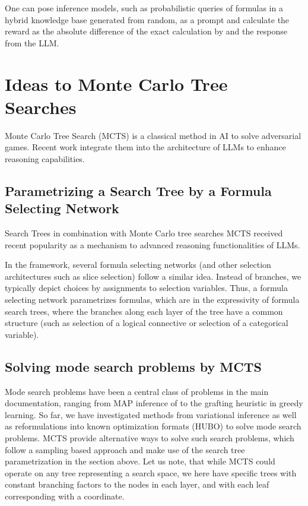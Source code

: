 \documentclass[aps,onecolumn,nofootinbib,pra]{article}
\begin{document}
One can pose \tnreason inference models, such as probabilistic queries of formulas in a hybrid knowledge base generated from random, as a prompt and calculate the reward as the absolute difference of the exact calculation by \tnreason and the response from the LLM.


\section{Ideas to Monte Carlo Tree Searches}

Monte Carlo Tree Search (MCTS) is a classical method in AI to solve adversarial games.
Recent work \cite{besta_reasoning_2025,xin_deepseek-prover-v15_2024} integrate them into the architecture of LLMs to enhance reasoning capabilities.


\subsection{Parametrizing a Search Tree by a Formula Selecting Network}

Search Trees in combination with Monte Carlo tree searches MCTS received recent popularity as a mechanism to advanced reasoning functionalities of LLMs.

In the \tnreason framework, several formula selecting networks (and other selection architectures such as slice selection) follow a similar idea.
Instead of branches, we typically depict choices by assignments to selection variables.
Thus, a formula selecting network parametrizes formulas, which are in the expressivity of formula search trees, where the branches along each layer of the tree have a common structure (such as selection of a logical connective or selection of a categorical variable).



\subsection{Solving mode search problems by MCTS}

Mode search problems have been a central class of problems in the main documentation, ranging from MAP inference of \MarkovLogicNetworks{} to the grafting heuristic in greedy learning.
So far, we have investigated methods from variational inference as well as reformulations into known optimization formats (HUBO) to solve mode search problems.
MCTS provide alternative ways to solve such search problems, which follow a sampling based approach and make use of the search tree parametrization in the section above.
Let us note, that while MCTS could operate on any tree representing a search space, we here have specific trees with constant branching factors to the nodes in each layer, and with each leaf corresponding with a coordinate.
\end{document}
